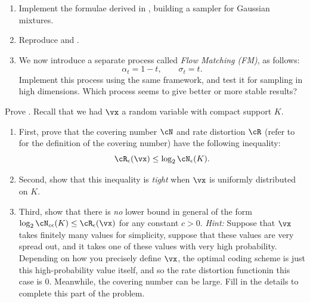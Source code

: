 \documentclass[../../book-main.tex]{subfiles}
\begin{document}
\begin{exercise}\label{exercise:implement_denoising_processes}
\begin{enumerate}
    \item Implement the formulae derived in , building a sampler for Gaussian mixtures.
    \item Reproduce  and .
    \item We now introduce a separate process called \textit{Flow Matching (FM)}, as follows:
    \begin{equation}
        \alpha_{t} = 1 - t, \qquad \sigma_{t} = t.
    \end{equation}
    Implement this process using the same framework, and test it for sampling in high dimensions. Which process seems to give better or more stable results?
\end{enumerate}
\end{exercise}

\begin{exercise}\label{exer:prop cover}
	Prove . Recall that we had \(\vx\) a random variable with compact support \(K\).
	\begin{enumerate}
		\item First, prove that the covering number \(\cN\) and rate distortion \(\cR\) (refer to  for the definition of the covering number) have the following inequality:
		\begin{equation}
			\cR_{\epsilon}(\vx) \leq \log_{2} \cN_{\epsilon}(K).
		\end{equation}
		\item Second, show that this inequality is \textit{tight} when \(\vx\) is uniformly distributed on \(K\).
		\item Third, show that there is \textit{no} lower bound in general of the form \(\log_{2} \cN_{c\epsilon}(K) \leq \cR_{\epsilon}(\vx)\) for any constant \(c > 0\). \textit{Hint:} Suppose that \(\vx\) takes finitely many values for simplicity, suppose that these values are very spread out, and it takes one of these values with very high probability. Depending on how you precisely define \(\vx\), the optimal coding scheme is just this high-probability value itself, and so the rate distortion functionin this case is \(0\). Meanwhile, the covering number can be large. Fill in the details to complete this part of the problem.
	\end{enumerate}
\end{exercise}
\end{document}
